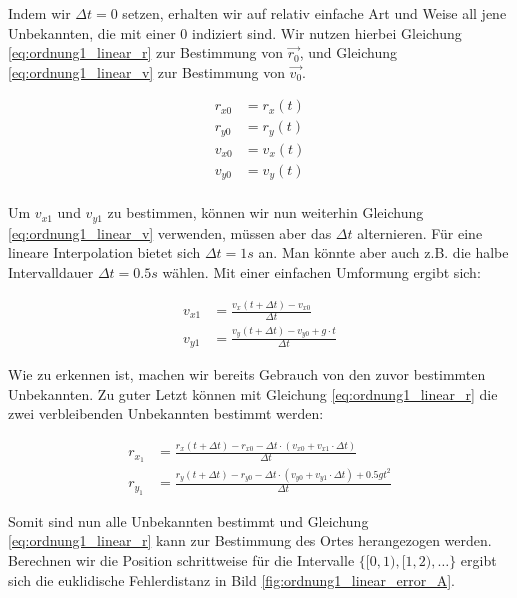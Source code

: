Indem wir $\Delta t = 0$ setzen, erhalten wir auf relativ einfache Art und Weise all jene Unbekannten, die mit einer $0$ indiziert sind. Wir nutzen hierbei Gleichung \eqref{eq:ordnung1_linear_r} zur Bestimmung von $\vec{r_0}$, und Gleichung \eqref{eq:ordnung1_linear_v} zur Bestimmung von $\vec{v_0}$.

\begin{equation}
\label{eq:ordnung1_linear_solutionPart1}
\begin{aligned}
r_{x0} &= r_x(t) \\
r_{y0} &= r_y(t) \\
v_{x0} &= v_x(t) \\
v_{y0} &= v_y(t) \\
\end{aligned}
\end{equation}

Um $v_{x1}$ und $v_{y1}$ zu bestimmen, können wir nun weiterhin Gleichung \ref{eq:ordnung1_linear_v} verwenden, müssen aber das $\Delta t$ alternieren. Für eine lineare Interpolation bietet sich $\Delta t = 1s$ an. Man könnte aber auch z.B. die halbe Intervalldauer $\Delta t = 0.5s$ wählen. Mit einer einfachen Umformung ergibt sich:

\begin{equation}
\label{eq:ordnung1_linear_solutionPart2}
\begin{aligned}
v_{x1} &=  \frac{v_x(t + \Delta t) - v_{x0}}{\Delta t} \\
v_{y1} &=  \frac{v_y(t + \Delta t) - v_{y0} + g \cdot t}{\Delta t}
\end{aligned}
\end{equation}

Wie zu erkennen ist, machen wir bereits Gebrauch von den zuvor bestimmten Unbekannten. Zu guter Letzt können mit Gleichung \ref{eq:ordnung1_linear_r} die zwei verbleibenden Unbekannten bestimmt werden:

\begin{equation}
\label{eq:ordnung1_linear_solutionPart3}
\begin{aligned}
r_{x_1} &= \frac{r_x(t + \Delta t) - r_{x0} - \Delta t \cdot(v_{x0} + v_{x1}  \cdot \Delta t)}{\Delta t} \\
r_{y_1} &= \frac{r_y(t + \Delta t) - r_{y0} - \Delta t \cdot(v_{y0} + v_{y1}  \cdot \Delta t) + 0.5gt^2}{\Delta t}
\end{aligned}
\end{equation}


Somit sind nun alle Unbekannten bestimmt und Gleichung \eqref{eq:ordnung1_linear_r} kann zur Bestimmung des Ortes herangezogen werden. Berechnen wir die Position schrittweise für die Intervalle $\{[0,1), [1, 2), \dots\}$ ergibt sich die euklidische Fehlerdistanz in Bild \ref{fig:ordnung1_linear_error_A}.


